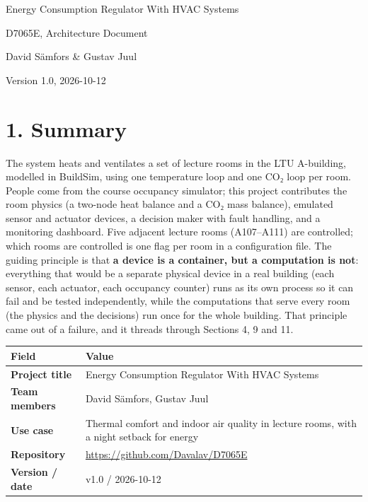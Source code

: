 \documentclass[11pt]{article}
\makeatletter
\DeclareRobustCommand{\_}{\ifmmode\nfss@text{\textunderscore}\else\textunderscore\allowbreak\fi}
\makeatother
\begin{document}
\begin{center}
{\LARGE Energy Consumption Regulator With HVAC Systems\par}
\vspace{0.5em}
{\large D7065E, Architecture Document\par}
\vspace{1em}
{David Sämfors \& Gustav Juul\par}
\vspace{0.3em}
{\small Version 1.0, 2026-10-12\par}
\end{center}

\vspace{1.2em}

{
\hypersetup{linkcolor=black}
\setcounter{tocdepth}{2}
\tableofcontents
}

\newpage
\section{1. Summary}

The system heats and ventilates a set of lecture rooms in the LTU A-building,
modelled in BuildSim, using one temperature loop and one CO₂ loop per room.
People come from the course occupancy simulator; this project contributes the
room physics (a two-node heat balance and a CO₂ mass balance), emulated sensor and
actuator devices, a decision maker with fault handling, and a monitoring
dashboard. Five adjacent lecture rooms (A107–A111) are
controlled; which rooms are controlled is one flag per room in a configuration
file. The guiding principle is that \textbf{a device is a container, but a
computation is not}: everything that would be a separate physical device in a
real building (each sensor, each actuator, each occupancy counter) runs as its own
process so it can fail and be tested independently, while the computations that
serve every room (the physics and the decisions) run once for the whole building.
That principle came out of a failure, and it threads through Sections 4, 9 and 11.

\begin{longtable}[]{@{}
  >{\raggedright\arraybackslash}p{}
  >{\raggedright\arraybackslash}p{}@{}}
\toprule
\textbf{Field} & \textbf{Value} \\
\midrule
\endhead
\textbf{Project title} & Energy Consumption Regulator With HVAC Systems \\
\textbf{Team members} & David Sämfors, Gustav Juul \\
\textbf{Use case} & Thermal comfort and indoor air quality in lecture rooms, with a night setback for energy \\
\textbf{Repository} & \url{https://github.com/Davalav/D7065E} \\
\textbf{Version / date} & v1.0 / 2026-10-12 \\
\bottomrule
\end{longtable}
\end{document}
